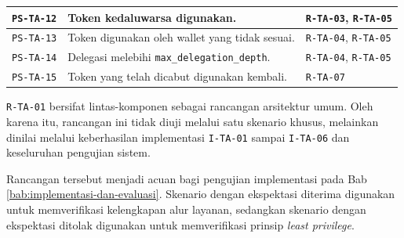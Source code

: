 \begin{table}[!ht]
\begin{tabular}{|p{}|p{}|p{}|}
		\texttt{PS-TA-12} & Token kedaluwarsa digunakan.                                              & \texttt{R-TA-03}, \texttt{R-TA-05}                   \\ \hline
		\texttt{PS-TA-13} & Token digunakan oleh wallet yang tidak sesuai.                            & \texttt{R-TA-04}, \texttt{R-TA-05}                   \\ \hline
		\texttt{PS-TA-14} & Delegasi melebihi \texttt{max\_delegation\_depth}.                        & \texttt{R-TA-04}, \texttt{R-TA-05}                   \\ \hline
		\texttt{PS-TA-15} & Token yang telah dicabut digunakan kembali.                               & \texttt{R-TA-07}                                     \\ \hline
	\end{tabular}
\end{table}

\texttt{R-TA-01} bersifat lintas-komponen sebagai rancangan arsitektur umum.
Oleh karena itu, rancangan ini tidak diuji melalui satu skenario khusus,
melainkan dinilai melalui keberhasilan implementasi \texttt{I-TA-01} sampai
\texttt{I-TA-06} dan keseluruhan pengujian sistem.

Rancangan tersebut menjadi acuan bagi pengujian implementasi pada Bab \ref{bab:implementasi-dan-evaluasi}. Skenario dengan ekspektasi diterima digunakan untuk memverifikasi kelengkapan alur layanan, sedangkan skenario dengan ekspektasi ditolak digunakan untuk memverifikasi prinsip \textit{least privilege}.